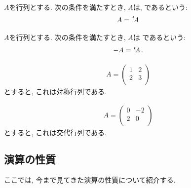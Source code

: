 \begin{definition}
  \label{def:symmat}
  $A$を行列とする.
  次の条件を満たすとき,
  $A$は,
  であるという:
  \begin{align*}
    A={\left.^{t}\!A\right.}
  \end{align*}
\end{definition}

\begin{definition}
  \label{def:altmat}
  $A$を行列とする.
  次の条件を満たすとき,
  $A$は
  であるという:
  \begin{align*}
    -A={\left.^{t}\!A\right.}.
  \end{align*}
\end{definition}

\begin{example}
  \begin{align*}
    A=
    \begin{pmatrix}
      1&2\\
      2&3\\
    \end{pmatrix}
  \end{align*}
  とすると, これは対称行列である.
\end{example}

\begin{example}
  \begin{align*}
    A=
    \begin{pmatrix}
      0&-2\\
      2&0\\
    \end{pmatrix}
  \end{align*}
  とすると, これは交代行列である.
\end{example}


\subsection{演算の性質}
ここでは, 今まで見てきた演算の性質について紹介する.

